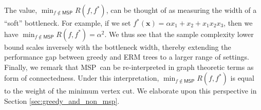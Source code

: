 \documentclass[11pt]{article}
\renewcommand{\bf}{\mathbf{f}}
\newcommand{\bx}{\mathbf{x}}
\newcommand{\by}{\mathbf{y}}
\newcommand{\bX}{\mathbf{X}}
\newcommand{\beps}{\boldsymbol{\epsilon}}
\newcommand{\nfeats}{d}
\newcommand{\MSP}{\textsf{MSP}}
\newcommand{\comment}[2]{{#2}}
\begin{document}
The value, $\min_{f\notin\MSP}R(f, f^*)$, can be thought of as measuring the width of a ``soft'' bottleneck.
For example, if we set $f^*(\bx) = \alpha x_1 + x_2 + x_1x_2x_3$, then we have $\min_{f\notin\MSP}R(f, f^*) = \alpha^2$.
We thus see that the sample complexity lower bound scales inversely with the bottleneck width, thereby extending the performance gap between greedy and ERM trees to a larger range of settings.
Finally, we remark that \MSP~can be re-interpreted in graph theoretic terms as form of connectedness.
Under this interpretation, $\min_{f\notin\MSP}R(f, f^*)$ is equal to the weight of the minimum vertex cut.
We elaborate upon this perspective in Section \ref{sec:greedy_and_non_msp}.





\end{document}
